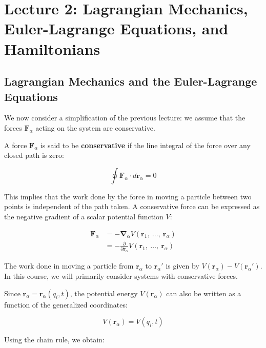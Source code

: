 \section{Lecture 2: Lagrangian Mechanics, Euler-Lagrange Equations, and Hamiltonians}

\subsection{Lagrangian Mechanics and the Euler-Lagrange Equations}

We now consider a simplification of the previous lecture: we assume that the forces 
$\mathbf{F}_\alpha$ acting on the system are conservative.

\begin{definition}
A force $\mathbf{F}_\alpha$ is said to be \textbf{conservative} if the line integral of 
the force over any closed path is zero:

\begin{equation}
    \oint \mathbf{F}_\alpha \cdot d\mathbf{r}_\alpha = 0
\end{equation}

\end{definition}

This implies that the work done by the force in moving a particle between two points is 
independent of the path taken.  A conservative force can be expressed as the negative 
gradient of a scalar potential function $V$:

\begin{align}
    \mathbf{F}_\alpha &= -\mathbf{\nabla}_\alpha V(\mathbf{r}_1,\ \dots,\ \mathbf{r}_\alpha) \\
    &= - \frac{\partial}{\partial \mathbf{r}_\alpha} V(\mathbf{r}_1,\ \dots,\ \mathbf{r}_\alpha)
\end{align}

The work done in moving a particle from $\mathbf{r}_\alpha$ to $\mathbf{r}_\alpha'$ is 
given by $V(\mathbf{r}_\alpha) - V(\mathbf{r}_\alpha')$. In this course, we will 
primarily consider systems with conservative forces.

Since $\mathbf{r}_\alpha=\mathbf{r}_\alpha(q_i, t)$, the potential energy 
$V(\mathbf{r}_\alpha)$ can also be written as a function of the generalized coordinates:

\begin{equation}
    V(\mathbf{r}_\alpha)=V(q_i, t)
\end{equation}

Using the chain rule, we obtain:

